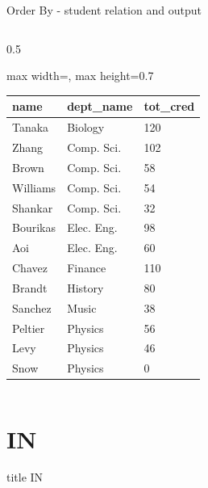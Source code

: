\documentclass[aspectratio=169, xcolor=dvipsnames]{beamer}
\begin{document}
\begin{frame}[fragile]{Order By - student relation and output}
\begin{columns}
\begin{column}{0.5\textwidth}
\begin{center}
\begin{adjustbox}{max width=\textwidth, max height=0.7\textheight}
\begin{tabular}{|l|l|l|}
                \hline
                \textbf{name} & \textbf{dept\_name} & \textbf{tot\_cred} \\ \hline
                Tanaka & Biology & 120 \\ \hline
                Zhang & Comp. Sci. & 102 \\ \hline
                Brown & Comp. Sci. & 58 \\ \hline
                Williams & Comp. Sci. & 54 \\ \hline
                Shankar & Comp. Sci. & 32 \\ \hline
                Bourikas & Elec. Eng. & 98 \\ \hline
                Aoi & Elec. Eng. & 60 \\ \hline
                Chavez & Finance & 110 \\ \hline
                Brandt & History & 80 \\ \hline
                Sanchez & Music & 38 \\ \hline
                Peltier & Physics & 56 \\ \hline
                Levy & Physics & 46 \\ \hline
                Snow & Physics & 0 \\ \hline
                \end{tabular}
                \end{adjustbox}
            \end{center}
        \end{column}
    \end{columns}
\end{frame}

\section{IN}
\begin{frame}
  \vfill
  \centering
  \begin{beamercolorbox}[sep=8pt,center,shadow=true,rounded=true]{title}
    IN\par%
  \end{beamercolorbox}
  \vfill
\end{frame}
\end{document}
